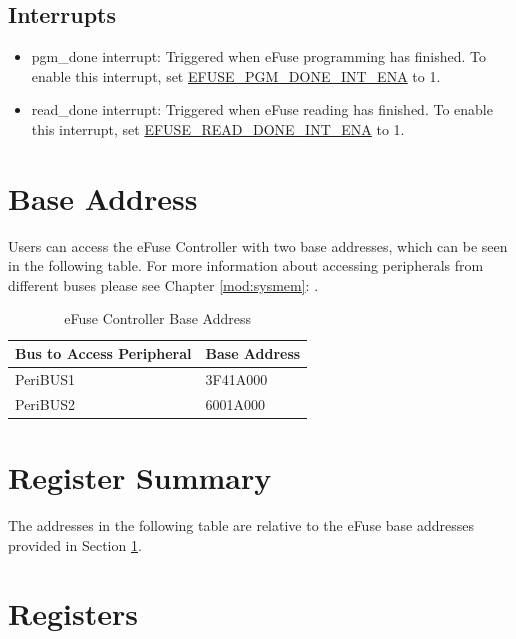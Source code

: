 \documentclass[main\_\_EN.tex]{subfiles}
\begin{document}
\subsection{Interrupts}
\begin{itemize}
\item pgm\_done interrupt: Triggered when eFuse programming has finished. To enable this interrupt, set \hyperref[fielddesc:EFUSEPGMDONEINTENA]{EFUSE\_PGM\_DONE\_INT\_ENA} to 1.
\item read\_done interrupt: Triggered when eFuse reading has finished. To enable this interrupt, set \hyperref[fielddesc:EFUSEREADDONEINTENA]{EFUSE\_READ\_DONE\_INT\_ENA} to 1.
\end{itemize}

\section{Base Address}\label{efuse base address}
Users can access the eFuse Controller with two base addresses, which can be seen in the following table. For more information about accessing peripherals from different buses please see Chapter \ref{mod:sysmem}: \textit{}.

\begin{longtable}[c]{ | l | C{3cm} | }
    \caption{eFuse Controller Base Address}
    \label{table:efusebaseaddress}
    \\\hline
    Bus to Access Peripheral  & Base Address \\\hline
    PeriBUS1 & \hexprefix{}3F41A000\\\hline
    PeriBUS2  &  \hexprefix{}6001A000\\\hline
\end{longtable}

\hypertarget{efuse-reg-summ}{}
\section{Register Summary}

The addresses in the following table are relative to the eFuse base addresses provided in Section \ref{efuse base address}.





\section{Registers}

\end{document}
